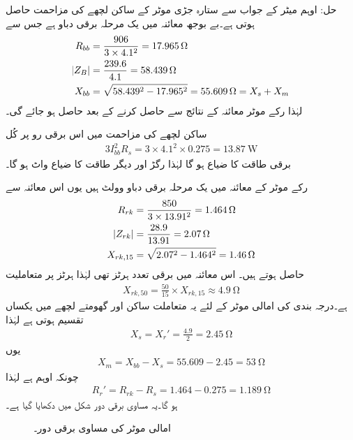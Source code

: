حل:
	اوہم میٹر کے جواب سے  ستارہ جڑی موٹر کے ساکن لچھے کی مزاحمت  حاصل ہوتی ہے۔بے بوجھ معائنہ میں یک مرحلہ برقی دباو  ہے جس سے
\begin{align*}
R_{bb} &=\frac{906}{3 \times 4.1^2}=\SI{17.965}{\ohm}\\
\abs{Z_B}&=\frac{239.6}{4.1}=\SI{58.439}{\ohm}\\
X_{bb}&=\sqrt{58.439^2-17.965^2}=\SI{55.609}{\ohm}=X_s+X_m
\end{align*}
لہٰذا  رکے موٹر معائنہ کے نتائج سے  حاصل کرنے کے بعد  حاصل ہو جائے گی۔

ساکن لچھے کی مزاحمت میں اس برقی رو پر کُل
\begin{align*}
3 I_{bb}^2 R_s=3 \times 4.1^2 \times  0.275=\SI{13.87}{\watt}
\end{align*}
برقی طاقت کا ضیاع ہو گا لہٰذا رگڑ اور دیگر طاقت کا ضیاع  واٹ ہو گا۔

رکے موٹر کے معائنہ میں یک مرحلہ برقی دباو  وولٹ ہیں یوں اس معائنہ سے
\begin{align*}
R_{rk}&=\frac{850}{3 \times 13.91^2}=\SI{1.464}{\ohm}\\
\abs{Z_{rk}}&=\frac{28.9}{13.91}=\SI{2.07}{\ohm}\\
X_{rk, 15}&=\sqrt{2.07^2-1.464^2}=\SI{1.46}{\ohm}
\end{align*}
حاصل ہوتے ہیں۔ اس معائنہ میں برقی تعدد  ہرٹز تھی لہٰذا  ہرٹز پر متعاملیت
\begin{align*}
X_{rk,50}=\frac{50}{15} \times X_{rk,15} \approx \SI{4.9}{\ohm}
\end{align*}
ہے۔درجہ بندی  کی امالی موٹر کے لئے یہ متعاملت ساکن اور گھومتے لچھے میں یکساں تقسیم ہوتی ہے لہٰذا
\begin{align*}
X_s=X_r'=\frac{4.9}{2}=\SI{2.45}{\ohm}
\end{align*}
یوں
\begin{align*}
X_m=X_{bb}-X_s=55.609-2.45=\SI{53}{\ohm}
\end{align*}
چونکہ   اوہم ہے  لہٰذا
\begin{align*}
R_r'=R_{rk}-R_s=1.464-0.275=\SI{1.189}{\ohm}
\end{align*}
ہو گا۔یہ مساوی برقی دور شکل  میں دکھایا گیا ہے۔
\begin{figure}
\centering
\caption{امالی موٹر کی مساوی برقی دور۔}
\label{شکل_امالی_موٹر_مثال_کا_دور}
\end{figure}

